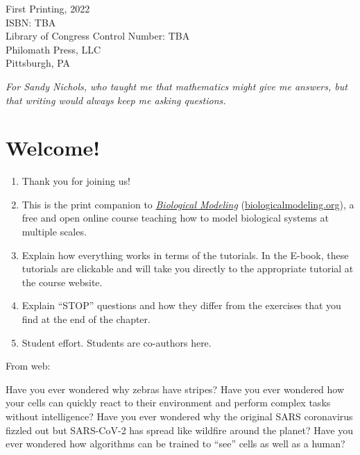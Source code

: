 \noindent First Printing, 2022\\

\noindent ISBN: TBA\\

\noindent Library of Congress Control Number: TBA\\

\noindent Philomath Press, LLC\\
Pittsburgh, PA
\addtocounter{page}{-1}


\begin{dedication}
\textit{For Sandy Nichols, who taught me that mathematics might give me answers, but that writing would always keep me asking questions.}\\[\baselineskip]
\thispagestyle{empty}
\end{dedication}

\newpage
{}



\newpage
{}
\chapter{Welcome!}

\begin{enumerate}
\item Thank you for joining us!
\item This is the print companion to \href{https://biologicalmodeling.org}{\textit{Biological Modeling}} (\href{https://biologicalmodeling.org}{biologicalmodeling.org}), a free and open online course teaching how to model biological systems at multiple scales.
\item Explain how everything works in terms of the tutorials. In the E-book, these tutorials are clickable and will take you directly to the appropriate tutorial at the course website.
\item Explain ``STOP'' questions and how they differ from the exercises that you find at the end of the chapter.
\item Student effort. Students are co-authors here.
\end{enumerate}

From web: 

Have you ever wondered why zebras have stripes? Have you ever wondered how your cells can quickly react to their environment and perform complex tasks without intelligence? Have you ever wondered why the original SARS coronavirus fizzled out but SARS-CoV-2 has spread like wildfire around the planet? Have you ever wondered how algorithms can be trained to “see” cells as well as a human?

